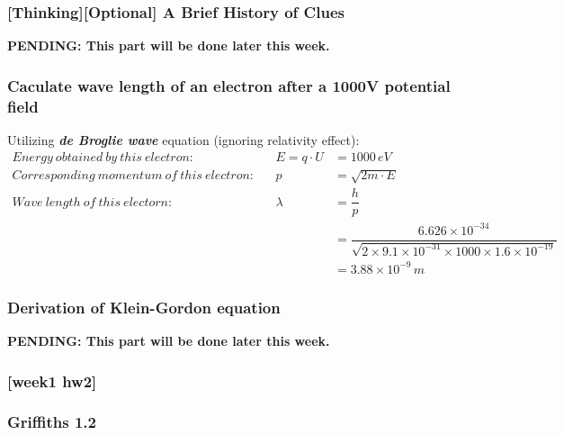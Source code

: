         \subsubsection{[Thinking][Optional] A Brief History of Clues}
        {\color{hwSolution}
            \textbf{PENDING: This part will be done later this week.}
        }
        \subsubsection{Caculate wave length of an electron after a 1000V potential field}
        
        {\color{hwSolution}
        Utilizing \textit{\textbf{de Broglie wave}} equation (ignoring relativity effect):
        \begin{align*}
            Energy~obtained~by~this~electron:&& E = q\cdot U &= 1000\,eV\\
            Corresponding~momentum~of~this~electron:&& p &= \sqrt{2m\cdot E}\\
            Wave~length~of~this~electorn:&& \lambda &= \dfrac{h}{p}\\
            &&&=\dfrac{6.626\times10^{-34}}{\sqrt{2\times 9.1\times 10^{-31}\times 1000\times 1.6\times10^{-19}}}\\
            &&&=3.88\times 10^{-9}\,m
        \end{align*}
        }

        \subsubsection{Derivation of Klein-Gordon equation}

        {\color{hwSolution}
            \textbf{PENDING: This part will be done later this week.}
        }
        \subsubsection*{[week1 hw2]}
        \subsubsection{Griffiths 1.2}
        
